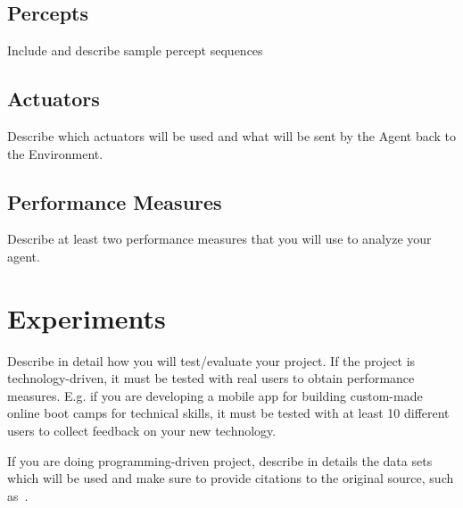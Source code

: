 \documentclass{article}
\begin{document}
\subsection{Percepts}
Include and describe sample percept sequences
\subsection{Actuators}
Describe which actuators will be used and what will be sent by the Agent back to the Environment.
\subsection{Performance Measures}
Describe at least two performance measures that you will use to analyze your agent.

\section{Experiments}
Describe in detail how you will test/evaluate your project.
If the project is technology-driven, it must be tested with real users to obtain performance measures.  E.g. if you are developing a mobile app for building custom-made online boot camps for technical skills, it must be tested with at least 10 different users to collect feedback on your new technology.

If you are doing programming-driven project, describe in details the data sets which will be used and make sure to provide citations to the original source, such as~\cite{knuthwebsite}. 

 

\end{document}
